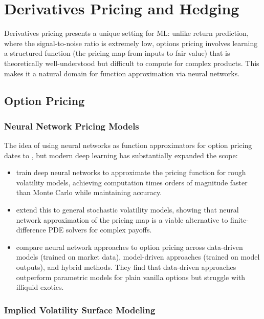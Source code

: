 \section{Derivatives Pricing and Hedging}\label{sec:derivatives}

Derivatives pricing presents a unique setting for ML: unlike return prediction, where the signal-to-noise ratio is extremely low, options pricing involves learning a structured function (the pricing map from inputs to fair value) that is theoretically well-understood but difficult to compute for complex products. This makes it a natural domain for function approximation via neural networks.

\subsection{Option Pricing}

\subsubsection{Neural Network Pricing Models}

The idea of using neural networks as function approximators for option pricing dates to \citet{Hutchinson1994}, but modern deep learning has substantially expanded the scope:

\begin{itemize}[leftmargin=*]
    \item \citet{Bayer2019} train deep neural networks to approximate the pricing function for rough volatility models, achieving computation times orders of magnitude faster than Monte Carlo while maintaining accuracy.

    \item \citet{Horvath2021} extend this to general stochastic volatility models, showing that neural network approximation of the pricing map is a viable alternative to finite-difference PDE solvers for complex payoffs.

    \item \citet{Ruf2020} compare neural network approaches to option pricing across data-driven models (trained on market data), model-driven approaches (trained on model outputs), and hybrid methods. They find that data-driven approaches outperform parametric models for plain vanilla options but struggle with illiquid exotics.
\end{itemize}

\subsubsection{Implied Volatility Surface Modeling}

